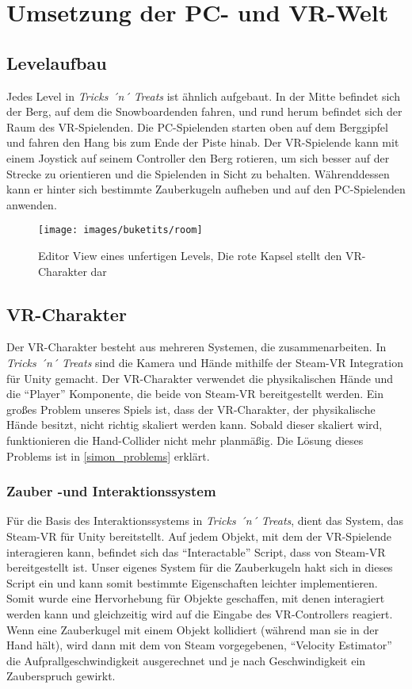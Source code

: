 \chapter{Umsetzung der PC- und VR-Welt}
\section{Levelaufbau}
Jedes Level in \emph{Tricks ´n´ Treats} ist ähnlich aufgebaut. 
In der Mitte befindet sich der Berg, auf dem die Snowboardenden fahren, und rund herum befindet sich der Raum des VR-Spielenden. Die PC-Spielenden starten oben auf dem Berggipfel und fahren den Hang bis zum Ende der Piste hinab. Der VR-Spielende kann mit einem Joystick auf seinem Controller den Berg rotieren, um sich besser auf der Strecke zu orientieren und die Spielenden in Sicht zu behalten. Währenddessen kann er hinter sich bestimmte Zauberkugeln aufheben und auf den PC-Spielenden anwenden.


\begin{figure}[H]
	\centering
	\texttt{[image: images/buketits/room]}
	\caption{Editor View eines unfertigen Levels, Die rote Kapsel stellt den VR-Charakter dar}
\end{figure}

\section{VR-Charakter} \label{simon_vrspieler}
Der VR-Charakter besteht aus mehreren Systemen, die zusammenarbeiten. In \emph{Tricks ´n´ Treats} sind die Kamera und Hände mithilfe der Steam-VR Integration für Unity gemacht. Der VR-Charakter verwendet die physikalischen Hände und die "`Player"' Komponente, die beide von Steam-VR bereitgestellt werden. Ein großes Problem unseres Spiels ist, dass der VR-Charakter, der physikalische Hände besitzt, nicht richtig skaliert werden kann. Sobald dieser skaliert wird, funktionieren die Hand-Collider nicht mehr planmäßig. Die Lösung dieses Problems ist in \ref{simon_problems} erklärt.

\subsection{Zauber -und Interaktionssystem}
Für die Basis des Interaktionssystems in \emph{Tricks ´n´ Treats}, dient das System, das Steam-VR für Unity bereitstellt. Auf jedem Objekt, mit dem der VR-Spielende interagieren kann, befindet sich das "`Interactable"' Script, dass von Steam-VR bereitgestellt ist. Unser eigenes System für die Zauberkugeln hakt sich in dieses Script ein und kann somit bestimmte Eigenschaften leichter implementieren. Somit wurde eine Hervorhebung für Objekte geschaffen, mit denen interagiert werden kann und gleichzeitig wird auf die Eingabe des VR-Controllers reagiert. Wenn eine Zauberkugel mit einem Objekt kollidiert (während man sie in der Hand hält), wird dann mit dem von Steam vorgegebenen, "`Velocity Estimator"' die Aufprallgeschwindigkeit ausgerechnet und je nach Geschwindigkeit ein Zauberspruch gewirkt.

